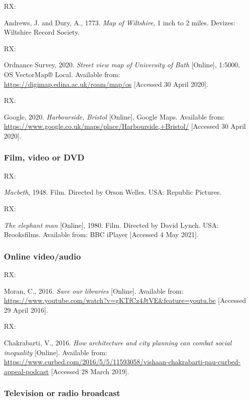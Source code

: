 RX: \cite{andrews.dury1773wilts}

Andrews, J. and Dury, A., 1773. \emph{Map of Wiltshire}, 1 inch to 2 miles. Devizes: Wiltshire Record Society.


RX: \cite{os2020bath}

Ordnance Survey, 2020. \emph{Street view map of University of Bath} [Online], 1:5000, OS VectorMap® Local. Available from: \url{https://digimap.edina.ac.uk/roam/map/os} [Accessed 30 April 2020].


RX: \cite{google2020harbourside}

Google, 2020. \emph{Harbourside, Bristol} [Online], Google Maps. Available from: \url{https://www.google.co.uk/maps/place/Harbourside,+Bristol/} [Accessed 30 April 2020].



\subsubsection*{Film, video or DVD}

RX: \cite{macbeth1948}

\emph{Macbeth}, 1948. Film. Directed by Orson Welles. USA: Republic Pictures.


RX: \cite{elephant-man1980}

\emph{The elephant man} [Online], 1980. Film. Directed by David Lynch. USA: Brooksfilms. Available from: BBC iPlayer [Accessed 4 May 2021].



\subsubsection*{Online video\slash audio}

RX: \cite{moran2016sol}

Moran, C., 2016. \emph{Save our libraries} [Online]. Available from: \url{https://www.youtube.com/watch?v=gKTfCz4JtVE&feature=youtu.be} [Accessed 29 April 2016].


RX: \cite{chakrabarti2016hac}

Chakrabarti, V., 2016. \emph{How architecture and city planning can combat social inequality} [Online]. Available from: \url{https://www.curbed.com/2016/5/5/11593058/vishaan-chakrabarti-pau-curbed-appeal-podcast} [Accessed 28 March 2019].



\subsubsection*{Television or radio broadcast}

